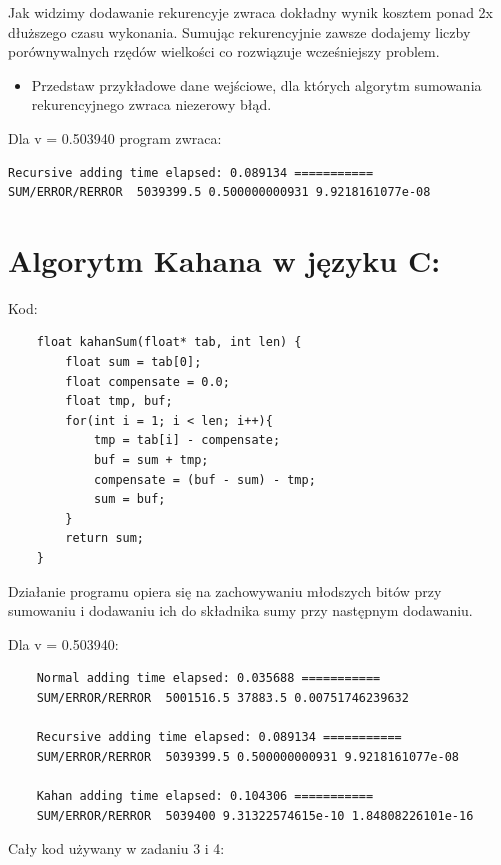 \documentclass{article}
\begin{document}
Jak widzimy dodawanie rekurencyje zwraca dokładny wynik kosztem ponad 2x dłuższego czasu wykonania. Sumując rekurencyjnie zawsze dodajemy liczby porównywalnych rzędów wielkości co rozwiązuje wcześniejszy problem.

\begin{itemize}
	\item Przedstaw przykładowe dane wejściowe, dla których algorytm sumowania rekurencyjnego zwraca niezerowy błąd.
\end{itemize}

Dla v = 0.503940 program zwraca:

\begin{lstlisting}
Recursive adding time elapsed: 0.089134 ===========
SUM/ERROR/RERROR  5039399.5 0.500000000931 9.9218161077e-08
\end{lstlisting}


\section{Algorytm Kahana w języku C:}

Kod:

\begin{verbatim}
	float kahanSum(float* tab, int len) {
		float sum = tab[0];
		float compensate = 0.0;
		float tmp, buf;
		for(int i = 1; i < len; i++){
			tmp = tab[i] - compensate;
			buf = sum + tmp;
			compensate = (buf - sum) - tmp;
			sum = buf;
		}
		return sum;
	}
\end{verbatim}

Działanie programu opiera się na zachowywaniu młodszych bitów przy sumowaniu i dodawaniu ich do składnika sumy przy następnym dodawaniu.

Dla v = 0.503940:

\begin{lstlisting}
	Normal adding time elapsed: 0.035688 ===========
	SUM/ERROR/RERROR  5001516.5 37883.5 0.00751746239632

	Recursive adding time elapsed: 0.089134 ===========
	SUM/ERROR/RERROR  5039399.5 0.500000000931 9.9218161077e-08

	Kahan adding time elapsed: 0.104306 ===========
	SUM/ERROR/RERROR  5039400 9.31322574615e-10 1.84808226101e-16
\end{lstlisting}
	


\clearpage
\newpage

Cały kod używany w zadaniu 3 i 4:
\end{document}

